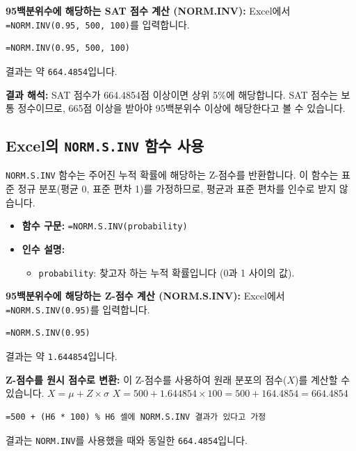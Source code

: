 \documentclass[11pt,a4paper]{article}
\begin{document}
\begin{examplebox}
    \textbf{95백분위수에 해당하는 SAT 점수 계산 (NORM.INV):}
    Excel에서 \texttt{=NORM.INV(0.95, 500, 100)}를 입력합니다.
    \begin{lstlisting}[language=Excel, caption={Excel에서 NORM.INV 함수 사용 예시}, label={lst:norm_inv_example}]
=NORM.INV(0.95, 500, 100)
    \end{lstlisting}
    결과는 약 \texttt{664.4854}입니다.

    \textbf{결과 해석:}
    SAT 점수가 664.4854점 이상이면 상위 5\%에 해당합니다.
    SAT 점수는 보통 정수이므로, 665점 이상을 받아야 95백분위수 이상에 해당한다고 볼 수 있습니다.
\end{examplebox}

\subsection{Excel의 \texttt{NORM.S.INV} 함수 사용}
\texttt{NORM.S.INV} 함수는 주어진 누적 확률에 해당하는 Z-점수를 반환합니다.
이 함수는 표준 정규 분포(평균 0, 표준 편차 1)를 가정하므로, 평균과 표준 편차를 인수로 받지 않습니다.

\begin{itemize}
    \item \textbf{함수 구문:} \texttt{=NORM.S.INV(probability)}
    \item \textbf{인수 설명:}
    \begin{itemize}
        \item \texttt{probability}: 찾고자 하는 누적 확률입니다 (0과 1 사이의 값).
    \end{itemize}
\end{itemize}

\begin{examplebox}
    \textbf{95백분위수에 해당하는 Z-점수 계산 (NORM.S.INV):}
    Excel에서 \texttt{=NORM.S.INV(0.95)}를 입력합니다.
    \begin{lstlisting}[language=Excel, caption={Excel에서 NORM.S.INV 함수 사용 예시}, label={lst:norm_s_inv_example}]
=NORM.S.INV(0.95)
    \end{lstlisting}
    결과는 약 \texttt{1.644854}입니다.

    \textbf{Z-점수를 원시 점수로 변환:}
    이 Z-점수를 사용하여 원래 분포의 점수($X$)를 계산할 수 있습니다.
    $X = \mu + Z \times \sigma$
    $X = 500 + 1.644854 \times 100 = 500 + 164.4854 = 664.4854$
    \begin{lstlisting}[language=Excel, caption={Z-점수를 원시 점수로 변환하는 Excel 수식}, label={lst:z_to_x_formula}]
=500 + (H6 * 100) % H6 셀에 NORM.S.INV 결과가 있다고 가정
    \end{lstlisting}
    결과는 \texttt{NORM.INV}를 사용했을 때와 동일한 \texttt{664.4854}입니다.
\end{examplebox}
\end{document}

